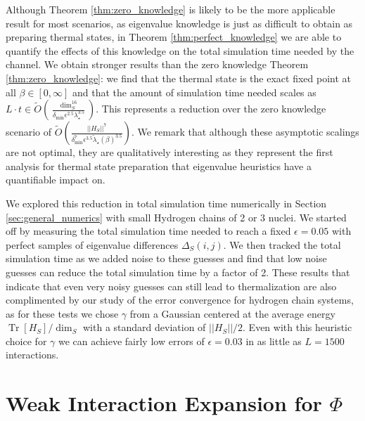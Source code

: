 \documentclass[
 amsmath,amssymb,
 aps,
onecolumn, 
nofootinbib]{revtex4-2}
\newcommand{\brackets}[1]{\left[ #1 \right]}
\newcommand{\norm}[1]{\left|\left| #1 \right|\right|}
\newcommand{\bigotilde}[1]{\widetilde{O} \left( #1 \right)}
\DeclareMathOperator{\Tr}{Tr}
\newcommand{\trace}[1]{\Tr \brackets{ #1 }}
\begin{document}
Although Theorem \ref{thm:zero_knowledge} is likely to be the more applicable result for most scenarios, as eigenvalue knowledge is just as difficult to obtain as preparing thermal states, in Theorem \ref{thm:perfect_knowledge} we are able to quantify the effects of this knowledge on the total simulation time needed by the channel. We obtain stronger results than the zero knowledge Theorem \ref{thm:zero_knowledge}: we find that the thermal state is the exact fixed point at all $\beta \in [0, \infty]$ and that the amount of simulation time needed scales as $L \cdot t \in \bigotilde{\frac{\dim_S^{16}}{\delta_{\min} \epsilon^{2.5} \lambda_\star^{3.5}}}$. This represents a reduction over the zero knowledge scenario of $\bigotilde{\frac{\norm{H_S}^7}{\delta_{\min}^7 \epsilon^{3.5} \widetilde{\lambda}_\star(\beta)^{3.5}}}$. We remark that although these asymptotic scalings are not optimal, they are qualitatively interesting as they represent the first analysis for thermal state preparation that eigenvalue heuristics have a quantifiable impact on. 

We explored this reduction in total simulation time numerically in Section \ref{sec:general_numerics} with small Hydrogen chains of 2 or 3 nuclei. We started off by measuring the total simulation time needed to reach a fixed $\epsilon = 0.05$ with perfect samples of eigenvalue differences $\Delta_S(i,j)$. We then tracked the total simulation time as we added noise to these guesses and find that low noise guesses can reduce the total simulation time by a factor of 2. These results that indicate that even very noisy guesses can still lead to thermalization are also complimented by our study of the error convergence for hydrogen chain systems, as for these tests we chose $\gamma$ from a Gaussian centered at the average energy $\trace{H_S} / \dim_S$ with a standard deviation of $\norm{H_S} / 2$. Even with this heuristic choice for $\gamma$ we can achieve fairly low errors of $\epsilon = 0.03$ in as little as $L = 1500$ interactions.




\section{Weak Interaction Expansion for $\Phi$} \label{sec:weak_coupling}
\end{document}
